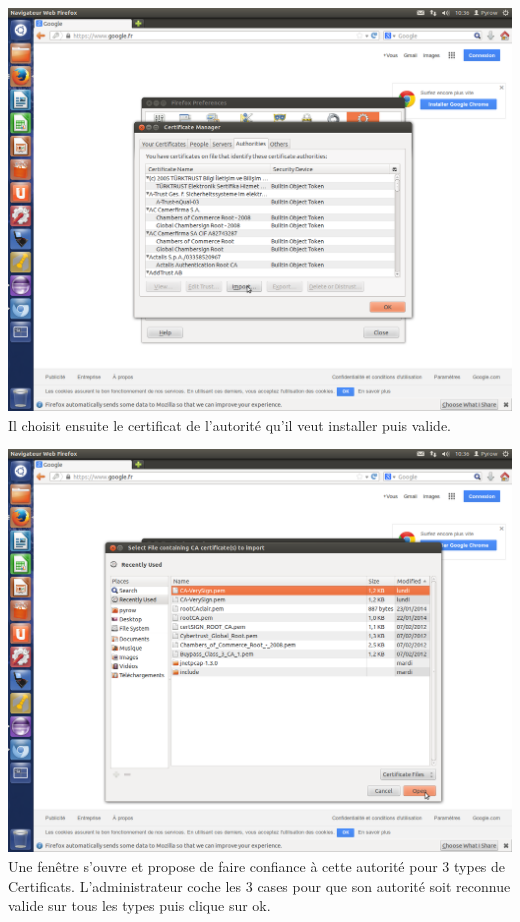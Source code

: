 \includegraphics[width=\textwidth]{images_autorites/OngletCA.png}
\newpage
Il choisit ensuite le certificat de l'autorité qu'il veut installer puis valide.

\includegraphics[width=\textwidth]{images_autorites/OngletImport.png}
\newpage
Une fenêtre s'ouvre et propose de faire confiance à cette autorité pour 3 types de Certificats. L'administrateur coche les 3 cases pour que son autorité soit reconnue valide sur tous les types puis clique sur ok.

